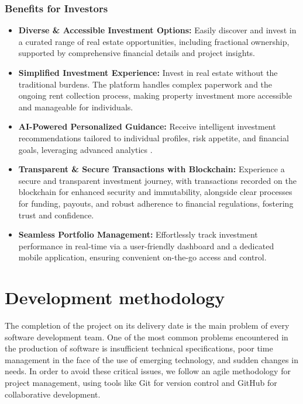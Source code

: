 \subsubsection*{Benefits for Investors}
\begin{itemize}
    \item \textbf{Diverse \& Accessible Investment Options:} Easily discover and invest in a curated range of real estate opportunities, including fractional ownership, supported by comprehensive financial details and project insights.
    \item \textbf{Simplified Investment Experience:} Invest in real estate without the traditional burdens. The platform handles complex paperwork and the ongoing rent collection process, making property investment more accessible and manageable for individuals.
    \item \textbf{AI-Powered Personalized Guidance:} Receive intelligent investment recommendations tailored to individual profiles, risk appetite, and financial goals, leveraging advanced analytics \cite{LinkedInAIFinTech2024, MobileRealityAIRealEstate2024, HouseCanaryAIInvestors2024, SmilkovTensorFlowJS2019}.
    \item \textbf{Transparent \& Secure Transactions with Blockchain:} Experience a secure and transparent investment journey, with transactions recorded on the blockchain for enhanced security and immutability, alongside clear processes for funding, payouts, and robust adherence to financial regulations, fostering trust and confidence.
    \item \textbf{Seamless Portfolio Management:} Effortlessly track investment performance in real-time via a user-friendly dashboard and a dedicated mobile application, ensuring convenient on-the-go access and control.
\end{itemize}


\section{Development methodology}

The completion of the project on its delivery date is the main problem of every software development team. One of the most common problems encountered in the production of software is insufficient technical specifications, poor time management in the face of the use of emerging technology, and sudden changes in needs. In order to avoid these critical issues, we follow an agile methodology for project management, using tools like Git \cite{GitWebsite} for version control and GitHub \cite{GithubWebsite} for collaborative development.

